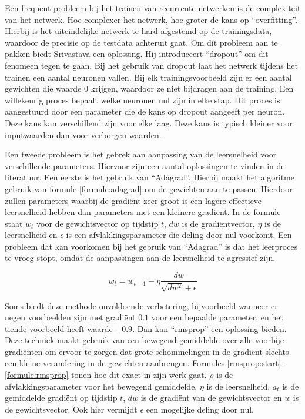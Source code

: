 Een frequent probleem bij het trainen van recurrente netwerken is de complexiteit van het netwerk. Hoe complexer het netwerk, hoe groter de kans op ``overfitting''. Hierbij is het uiteindelijke netwerk te hard afgestemd op de trainingsdata, waardoor de precisie op de testdata achteruit gaat. Om dit probleem aan te pakken biedt Srivastava\cite{Srivastava2013} een oplossing. Hij introduceert ``dropout'' om dit fenomeen tegen te gaan. Bij het gebruik van dropout laat het netwerk tijdens het trainen een aantal neuronen vallen. Bij elk trainingsvoorbeeld zijn er een aantal gewichten die waarde 0 krijgen, waardoor ze niet bijdragen aan de training. Een willekeurig proces bepaalt welke neuronen nul zijn in elke stap. Dit proces is aangestuurd door een parameter die de kans op dropout aangeeft per neuron. Deze  kans kan verschillend zijn voor elke laag. Deze kans is typisch kleiner voor inputwaarden dan voor verborgen waarden.

Een tweede probleem is het gebrek aan aanpassing van de leersnelheid voor verschillende parameters. Hiervoor zijn een aantal oplossingen te vinden in de literatuur. Een eerste is het gebruik van ``Adagrad''\cite{Duchi2011}. Hierbij maakt het algoritme gebruik van formule \eqref{formule:adagrad} om de gewichten aan te passen. Hierdoor zullen parameters waarbij de gradi\"ent zeer groot is een lagere effectieve leersnelheid hebben dan parameters met een kleinere gradi\"ent. In de formule staat $w_t$ voor de gewichtsvector op tijdstip $t$, $dw$ is de gradi\"entvector, $\eta$ is de leersnelheid en $\epsilon$ is een afvlakkingsparameter die deling door nul voorkomt. Een probleem dat kan voorkomen bij het gebruik van ``Adagrad'' is dat het leerproces te vroeg stopt, omdat de aanpassingen aan de leersnelheid te agressief zijn.
 
\begin{equation}
    w_t = w_{t-1} - \eta \frac{dw}{\sqrt{dw^2} + \epsilon}
    \label{formule:adagrad}
\end{equation}

Soms biedt deze methode onvoldoende verbetering, bijvoorbeeld wanneer er negen voorbeelden zijn met gradi\"ent $0.1$ voor een bepaalde parameter, en het tiende voorbeeld heeft waarde $-0.9$. Dan kan ``rmsprop''\cite{RMSprop} een oplossing bieden. Deze techniek maakt gebruik van een bewegend gemiddelde over alle voorbije gradi\"enten om ervoor te zorgen dat grote schommelingen in de gradi\"ent slechts een kleine verandering in de gewichten aanbrengen. Formules \eqref{rmsprop:start}-\eqref{formule:rmsprop} tonen hoe dit exact in zijn werk gaat. $\rho$ is de afvlakkingsparameter voor het bewegend gemiddelde, $\eta$ is de leersnelheid, $a_t$ is de gemiddelde gradi\"ent op tijdstip $t$, $dw$ is de gradi\"ent van de gewichtsvector en $w$ is de gewichtsvector. Ook hier vermijdt $\epsilon$ een mogelijke deling door nul.


